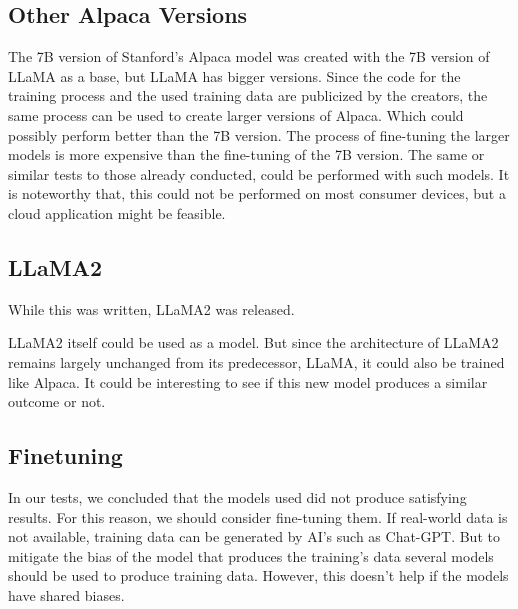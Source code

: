 \subsection{Other Alpaca Versions}


The 7B version of Stanford's Alpaca model was created with the 7B version of LLaMA as a base\cite{alpaca}, but LLaMA has bigger versions\cite{touvron2023llama}.  Since the code for the training process and the used training data are publicized by the creators, the same process can be used to create larger versions of Alpaca. Which could possibly perform better than the 7B version. The process of fine-tuning the larger models is more expensive than the fine-tuning of the 7B version. The same or similar tests to those already conducted, could be performed with such models. It is noteworthy that, this could not be performed on most consumer devices, but a cloud application might be feasible.



\subsection{LLaMA2}


While this was written, LLaMA2 was released.\cite{touvron2023llama2}

LLaMA2 itself could be used as a model. But since the architecture of LLaMA2 remains largely unchanged from its predecessor, LLaMA, it could also be trained like Alpaca. It could be interesting to see if this new model produces a similar outcome or not.



\subsection{Finetuning}


In our tests, we concluded that the models used did not produce satisfying results. For this reason, we should consider fine-tuning them. If real-world data is not available, training data can be generated by AI's such as Chat-GPT. But to mitigate the bias of the model that produces the training's data several models should be used to produce training data. However, this doesn't help if the models have shared biases.





